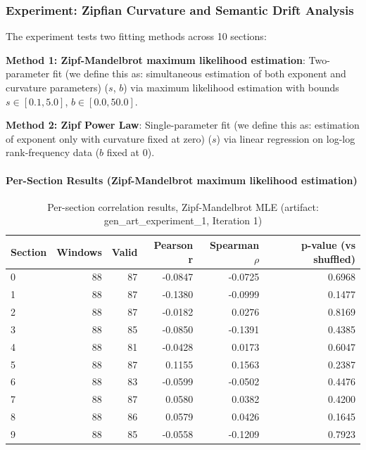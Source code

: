 \documentclass[11pt,letterpaper]{article}
\begin{document}
\subsubsection{Experiment: Zipfian Curvature and Semantic Drift Analysis}

The experiment tests two fitting methods across 10 sections:

\textbf{Method 1: Zipf-Mandelbrot maximum likelihood estimation}: Two-parameter fit (we define this as: simultaneous estimation of both exponent and curvature parameters) ($s$, $b$) via maximum likelihood estimation with bounds $s \in [0.1, 5.0]$, $b \in [0.0, 50.0]$.

\textbf{Method 2: Zipf Power Law}: Single-parameter fit (we define this as: estimation of exponent only with curvature fixed at zero) ($s$) via linear regression on log-log rank-frequency data ($b$ fixed at 0).

\paragraph{Per-Section Results (Zipf-Mandelbrot maximum likelihood estimation)}

\begin{table}[!htbp]
\centering
\caption{Per-section correlation results, Zipf-Mandelbrot MLE (artifact: gen\_art\_experiment\_1, Iteration 1)}
\label{tab:per_section_corr}
\begin{tabular}{lrrrrr}
\toprule
Section & Windows & Valid & Pearson r & Spearman $\rho$ & p-value (vs shuffled) \\
\midrule
0 & 88 & 87 & -0.0847 & -0.0725 & 0.6968 \\
1 & 88 & 87 & -0.1380 & -0.0999 & 0.1477 \\
2 & 88 & 87 & -0.0182 & 0.0276 & 0.8169 \\
3 & 88 & 85 & -0.0850 & -0.1391 & 0.4385 \\
4 & 88 & 81 & -0.0428 & 0.0173 & 0.6047 \\
5 & 88 & 87 & 0.1155 & 0.1563 & 0.2387 \\
6 & 88 & 83 & -0.0599 & -0.0502 & 0.4476 \\
7 & 88 & 87 & 0.0580 & 0.0382 & 0.4200 \\
8 & 88 & 86 & 0.0579 & 0.0426 & 0.1645 \\
9 & 88 & 85 & -0.0558 & -0.1209 & 0.7923 \\
\bottomrule
\end{tabular}
\end{table}
\end{document}
